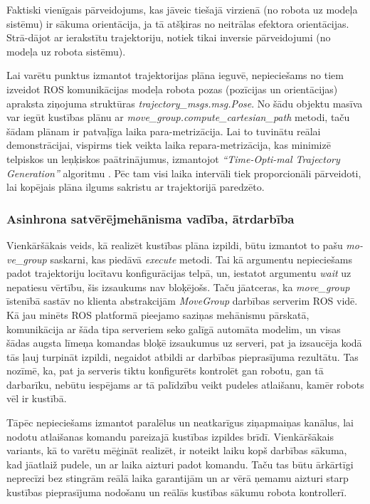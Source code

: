 \documentclass[12pt, a4paper]{article}
\numberwithin{equation}{section} %
\begin{document}
Faktiski vienīgais pārveidojums, kas jāveic tiešajā virzienā (no robota uz modeļa sistēmu) ir sākuma orientācija, ja tā atšķiras no neitrālas efektora orientācijas. Strā-dājot ar ierakstītu trajektoriju, notiek tikai inversie pārveidojumi (no modeļa uz robota sistēmu).

Lai varētu punktus izmantot trajektorijas plāna ieguvē, nepieciešams no tiem izveidot ROS komunikācijas modeļa robota pozas (pozīcijas un orientācijas) apraksta ziņojuma struktūras \textit{trajectory\_msgs.msg.Pose}. No šādu objektu masīva var iegūt kustības plānu ar \textit{move\_group.compute\_cartesian\_path} metodi, taču šādam plānam ir patvaļīga laika para-metrizācija. Lai to tuvinātu reālai demonstrācijai, vispirms tiek veikta laika repara-metrizācija, kas minimizē telpiskos un leņķiskos paātrinājumus, izmantojot \textit{``Time-Opti-mal Trajectory Generation''} algoritmu \cite{kunz2012time}. Pēc tam visi laika intervāli tiek proporcionāli pārveidoti, lai kopējais plāna ilgums sakristu ar trajektorijā paredzēto.

\subsubsection{Asinhrona satvērējmehānisma vadība, ātrdarbība}

Vienkāršākais veids, kā realizēt kustības plāna izpildi, būtu izmantot to pašu \textit{mo-ve\_group} saskarni, kas piedāvā \textit{execute} metodi. Tai kā argumentu nepieciešams padot trajektoriju locītavu konfigurācijas telpā, un, iestatot argumentu \textit{wait} uz nepatiesu vērtību, šis izsaukums nav bloķējošs. Taču jāatceras, ka \textit{move\_group} īstenībā sastāv no klienta abstrakcijām \textit{MoveGroup} darbības serverim ROS vidē. Kā jau minēts ROS platformā pieejamo saziņas mehānismu pārskatā, komunikācija ar šāda tipa serveriem seko galīgā automāta modelim, un visas šādas augsta līmeņa komandas bloķē izsaukumus uz serveri, pat ja izsaucēja kodā tās ļauj turpināt izpildi, negaidot atbildi ar darbības pieprasījuma rezultātu. Tas nozīmē, ka, pat ja serveris tiktu konfigurēts kontrolēt gan robotu, gan tā darbarīku, nebūtu iespējams ar tā palīdzību veikt pudeles atlaišanu, kamēr robots vēl ir kustībā.

Tāpēc nepieciešams izmantot paralēlus un neatkarīgus ziņapmaiņas kanālus, lai nodotu atlaišanas komandu pareizajā kustības izpildes brīdī. Vienkāršākais variants, kā to varētu mēģināt realizēt, ir noteikt laiku kopš darbības sākuma, kad jāatlaiž pudele, un ar laika aizturi padot komandu. Taču tas būtu ārkārtīgi neprecīzi bez stingrām reālā laika garantijām un ar vērā ņemamu aizturi starp kustības pieprasījuma nodošanu un reālās kustības sākumu robota kontrollerī.
\end{document}
